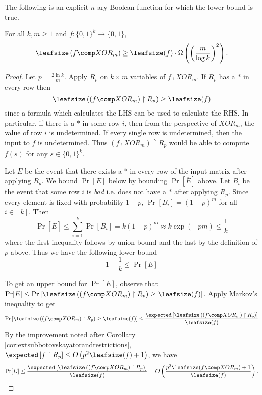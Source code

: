 The following is an explicit $n$-ary Boolean function for which the lower bound is true.
\begin{lemma}
	\label{lem:bdcompfwithxor}
	For all $k, m \geq 1$ and $f: \{0,1\}^k \rightarrow \{0,1\}$,
	\[\leafsize\left(f\comp XOR_m\right) \geq \leafsize(f) \cdot \Omega\left(\left(\frac{m}{\log k}\right)^2\right).\]
\end{lemma}
\begin{proof}
	Let $p = \frac{2\ln k}{m}$. Apply $R_p$ on $k\times m$ variables of $f \comp XOR_m$. If $R_p$ has a $*$ in every row then 
	\[\leafsize\left(\left(f\comp XOR_m\right) \upharpoonright R_p\right) \geq \leafsize(f)\]
	since a formula which calculates the LHS can be used to calculate the RHS. In particular, if there is a $*$ in some row $i$, then from the perspective of $XOR_m$, the value of row $i$ is undetermined. If every single row is undetermined, then the input to $f$ is undetermined. Thus $\left(f \comp XOR_m\right) \upharpoonright R_p$ would be able to compute $f(s)$ for any $s \in \{0,1\}^k$.
	
	Let $E$ be the event that there exists a $*$ in every row of the input matrix after applying $R_p$. We bound $\Pr[E]$ below by bounding $\Pr\left[\overline{E}\right]$ above. Let $B_i$ be the event that some row $i$ is \emph{bad} i.e. does not have a $*$ after applying $R_p$. Since every element is fixed with probability $1-p$, $\Pr[B_i] = (1 - p)^{m}$ for all $i \in [k]$. Then 
	\[\Pr\left[\overline{E}\right] \leq \sum_{i = 1}^{k} \Pr[B_i] = k(1-p)^{m} \approx k\exp(-pm) \leq \frac{1}{k}\] 
	where the first inequality follows by union-bound and the last by the definition of $p$ above. Thus we have the following lower bound
	\begin{equation}
		\label{eq:lbdlembdcomfwithxor}
		1 - \frac{1}{k} \leq \Pr\left[E\right] 
	\end{equation} 
	
	To get an upper bound for $\Pr[E]$, observe that $\Pr[E] \leq \Pr\left[\leafsize\left(\left(f \comp XOR_m\right) \upharpoonright R_p\right) \geq \leafsize(f)\right]$. Apply Markov's inequality to get
	\[\Pr\left[\leafsize\left(\left(f \comp XOR_m\right) \upharpoonright R_p\right) \geq \leafsize(f)\right] \leq \frac{\expected\left[\leafsize\left(\left(f \comp XOR_m\right) \upharpoonright R_p\right)\right]}{\leafsize(f)}\]
	By the improvement noted after Corollary \ref{cor:extsubbotovskayatorandrestrictions}, $\expected\left[f \upharpoonright R_p\right] \leq O\left(p^2\leafsize(f) + 1\right)$, we have
	\begin{equation}
		\label{eq:ubdlembdcomfwithxor}
		\Pr[E] \leq \frac{\expected\left[\leafsize\left(\left(f \comp XOR_m\right) \upharpoonright R_p\right)\right]}{\leafsize(f)} = O\left(\frac{p^2\leafsize(f \comp XOR_m) + 1}{\leafsize(f)}\right). 
	\end{equation} 
	

\end{proof}
